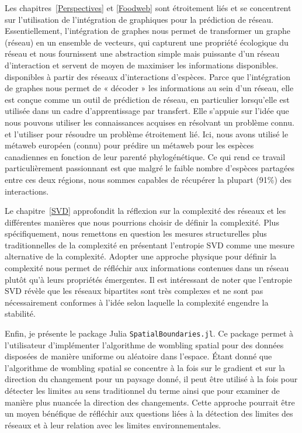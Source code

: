 \documentclass[12pt,oneside,phd]{dms}
\numberwithin{equation}{section}
\numberwithin{table}{chapter}
\numberwithin{figure}{chapter}
\begin{document}
Les chapitres~\ref{Perspectives} et \ref{Foodweb} sont étroitement liés et se concentrent sur l'utilisation de l'intégration de graphiques pour la prédiction de réseau. Essentiellement, l'intégration de graphes nous permet de transformer un graphe (réseau) en un ensemble de vecteurs, qui capturent une propriété écologique du réseau et nous fournissent une abstraction simple mais puissante d'un réseau d'interaction et servent de moyen de maximiser les informations disponibles. disponibles à partir des réseaux d’interactions d’espèces. Parce que l'intégration de graphes nous permet de « décoder » les informations au sein d'un réseau, elle est conçue comme un outil de prédiction de réseau, en particulier lorsqu'elle est utilisée dans un cadre d'apprentissage par transfert. Elle s'appuie sur l'idée que nous pouvons utiliser les connaissances acquises en résolvant un problème connu. et l'utiliser pour résoudre un problème étroitement lié. Ici, nous avons utilisé le métaweb européen (connu) pour prédire un métaweb pour les espèces canadiennes en fonction de leur parenté phylogénétique. Ce qui rend ce travail particulièrement passionnant est que malgré le faible nombre d’espèces partagées entre ces deux régions, nous sommes capables de récupérer la plupart (91\%) des interactions.

Le chapitre~\ref{SVD} approfondit la réflexion sur la complexité des réseaux et les différentes manières que nous pourrions choisir de définir la complexité. Plus spécifiquement, nous remettons en question les mesures structurelles plus traditionnelles de la complexité en présentant l'entropie SVD comme une mesure alternative de la complexité. Adopter une approche physique pour définir la complexité nous permet de réfléchir aux informations contenues dans un réseau plutôt qu'à leurs propriétés émergentes. Il est intéressant de noter que l’entropie SVD révèle que les réseaux bipartites sont très complexes et ne sont pas nécessairement conformes à l’idée selon laquelle la complexité engendre la stabilité.

Enfin, je présente le package Julia \texttt{SpatialBoundaries.jl}. Ce package permet à l'utilisateur d'implémenter l'algorithme de wombling spatial pour des données disposées de manière uniforme ou aléatoire dans l'espace. Étant donné que l’algorithme de wombling spatial se concentre à la fois sur le gradient et sur la direction du changement pour un paysage donné, il peut être utilisé à la fois pour détecter les limites au sens traditionnel du terme ainsi que pour examiner de manière plus nuancée la direction des changements. Cette approche pourrait être un moyen bénéfique de réfléchir aux questions liées à la détection des limites des réseaux et à leur relation avec les limites environnementales.
\end{document}
